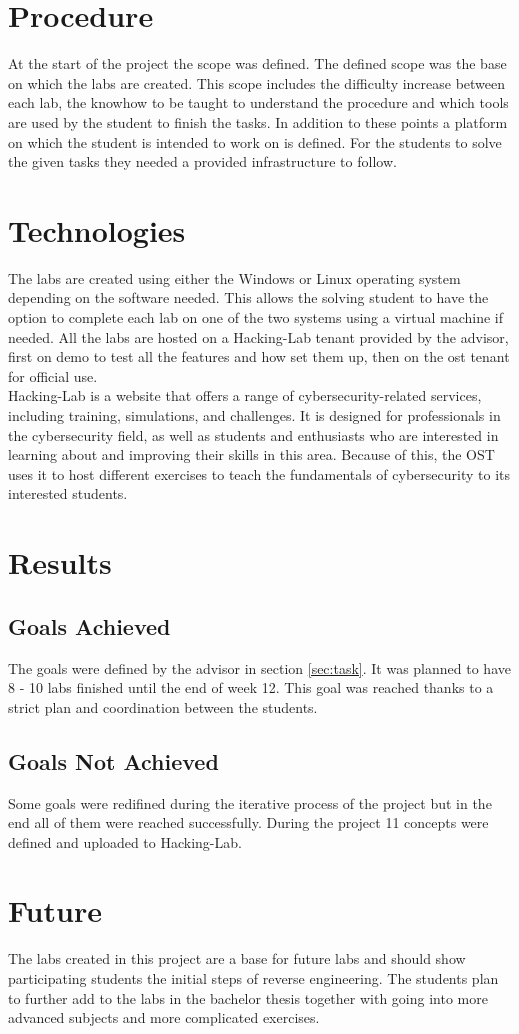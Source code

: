 \section{Procedure}
At the start of the project the scope was defined. The defined scope was the base on which the labs are created. This scope includes the difficulty increase between each lab, the knowhow to be taught to understand the procedure and which tools are used by the student to finish the tasks. In addition to these points a platform on which the student is intended to work on is defined.
For the students to solve the given tasks they needed a provided infrastructure to follow.

\section{Technologies}
The labs are created using either the Windows or Linux operating system depending on the software needed. This allows the solving student to have the option to complete each lab on one of the two systems using a virtual machine if needed. 
All the labs are hosted on a Hacking-Lab tenant provided by the advisor, first on demo to test all the features and how set them up, then on the ost tenant for official use. \\
Hacking-Lab is a website that offers a range of cybersecurity-related services, including training, simulations, and challenges. It is designed for professionals in the cybersecurity field, as well as students and enthusiasts who are interested in learning about and improving their skills in this area.
Because of this, the OST uses it to host different exercises to teach the fundamentals of cybersecurity to its interested students.

\section{Results}
\subsection{Goals Achieved}
The goals were defined by the advisor in section \ref{sec:task}. It was planned to have 8 - 10 labs finished until the end of week 12. This goal was reached thanks to a strict plan and coordination between the students.

\subsection{Goals Not Achieved}
Some goals were redifined during the iterative process of the project but in the end all of them were reached successfully. During the project 11 concepts were defined and uploaded to Hacking-Lab.

\section{Future}
The labs created in this project are a base for future labs and should show participating students the initial steps of reverse engineering. The students plan to further add to the labs in the bachelor thesis together with going into more advanced subjects and more complicated exercises. 
